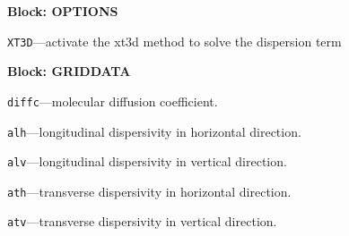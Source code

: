 
\item \textbf{Block: OPTIONS}

\begin{description}
\item \texttt{XT3D}---activate the xt3d method to solve the dispersion term

\end{description}
\item \textbf{Block: GRIDDATA}

\begin{description}
\item \texttt{diffc}---molecular diffusion coefficient.

\item \texttt{alh}---longitudinal dispersivity in horizontal direction.

\item \texttt{alv}---longitudinal dispersivity in vertical direction.

\item \texttt{ath}---transverse dispersivity in horizontal direction.

\item \texttt{atv}---transverse dispersivity in vertical direction.

\end{description}

